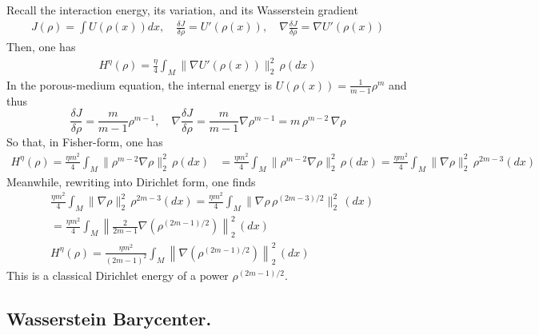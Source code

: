 \documentclass[reqno,11pt,letterpaper]{amsart}
\theoremstyle{plain}
\theoremstyle{definition}
\theoremstyle{remark}
\begin{document}
Recall the interaction energy, its variation, and its Wasserstein gradient
\begin{align*}
J(\rho) =  \int U(\rho(x))dx , \quad \frac{\delta J}{\delta \rho} = U'(\rho(x)), \quad \nabla \frac{\delta J}{\delta \rho} = \nabla U'(\rho(x))
\end{align*}
Then, one has
\begin{align}\label{eq:internal-ib}
H^{\eta}(\rho)= \frac{\eta}{4} \int_M \lVert \nabla U'(\rho(x))\rVert_{2}^{2} \,\rho(dx) 
\end{align}
In the porous-medium equation, the internal energy is $U(\rho(x)) = \frac{1}{m-1} \rho^{m}$ and thus
\[
\frac{\delta J}{\delta \rho} =
\frac{m}{m-1} \rho^{m-1} , \quad  \nabla \frac{\delta J}{\delta \rho} = \frac{m}{m-1} \nabla \rho^{m-1} = m\, \rho^{m-2} \,\nabla \rho
\]
So that, in Fisher-form, one has
\begin{align}\label{eq:porous-ib}
H^{\eta}(\rho)= \frac{\eta m^{2}}{4} \int_M \lVert \rho^{m-2}\nabla \rho\rVert_{2}^{2} \,\rho(dx) &=\frac{\eta m^{2}}{4} \int_M \lVert \rho^{m-2}\nabla \rho\rVert_{2}^{2} \,\rho(dx) =\frac{\eta m^{2}}{4} \int_M \lVert \nabla \rho\rVert_{2}^{2} \,\rho^{2m-3}(dx)
\end{align}
Meanwhile, rewriting into Dirichlet form, one finds
\begin{align*}
    &\frac{\eta m^{2}}{4} \int_M \lVert \nabla \rho\rVert_{2}^{2} \,\rho^{2m-3}(dx) = \frac{\eta m^{2}}{4} \int_M \lVert \nabla \rho \,\rho^{(2m-3)/2}\rVert_{2}^{2} \,(dx) \\
    &= \frac{\eta m^{2}}{4} \int_M \left\lVert \frac{2}{2m-1} \nabla (\rho^{(2m-1)/2} )\right\rVert_{2}^{2} \,(dx) \\
    & H^{\eta}(\rho)= \frac{\eta m^{2}}{(2m-1)^{2}} \int_M \left\lVert \nabla (\rho^{(2m-1)/2} )\right\rVert_{2}^{2} \,(dx)
\end{align*}
This is a classical Dirichlet energy of a power $\rho^{(2m-1)/2}$.

\subsection{Wasserstein Barycenter.}
\end{document}
